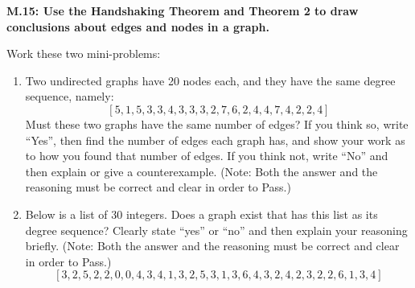 \documentclass[11pt]{article}
\begin{document}
	
	\thispagestyle{empty}
	\renewcommand{\headrulewidth}{1pt}
	\thispagestyle{fancy}
	\lfoot{}
	\cfoot{}
	\rfoot{}	
	
	\vspace*{0in}

\noindent 
\textbf{M.15: Use the Handshaking Theorem and Theorem 2 to draw conclusions about edges and nodes in a graph.}

\bigskip

Work these two mini-problems: 

\begin{enumerate}
 	\item Two undirected graphs have 20 nodes each, and they have the same degree sequence, namely: 
 	$$[5, 1, 5, 3, 3, 4, 3, 3, 3, 2, 7, 6, 2, 4, 4, 7, 4, 2, 2, 4]$$
 	Must these two graphs have the same number of edges? If you think so, write ``Yes'', then find the number of edges each graph has, and show your work as to how you found that number of edges. If you think not, write ``No'' and then explain or give a counterexample. (Note: Both the answer and the reasoning must be correct and clear in order to Pass.)

\vspace{3in}


 	\item Below is a list of 30 integers. Does a graph exist that has this list as its degree sequence? Clearly state ``yes'' or ``no'' and then explain your reasoning briefly. (Note: Both the answer and the reasoning must be correct and clear in order to Pass.)
 	$$[3, 2, 5, 2, 2, 0, 0, 4, 3, 4, 1, 3, 2, 5, 3, 1, 3, 6, 4, 3, 2, 4, 2, 3,
2, 2, 6, 1, 3, 4]$$ 	
 \end{enumerate} 

\medskip

\end{document}
